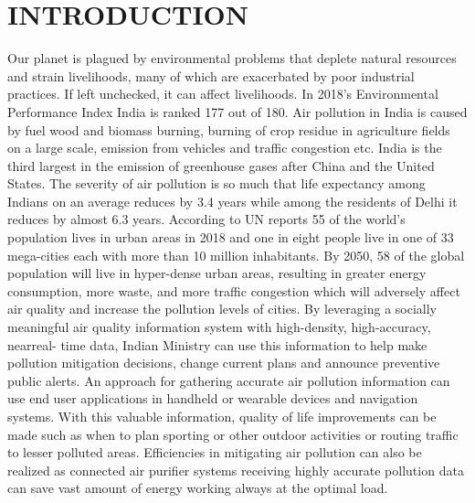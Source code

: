 \documentclass[12pt]{report}	%
\begin{document}

\fancyhf{}
\fancyhead[LE]{\leftmark}
\renewcommand{\footrulewidth}{0.4pt}
\pagestyle{fancy}

\chapter{INTRODUCTION}
Our planet is plagued by environmental problems that
deplete natural resources and strain livelihoods, many
of which are exacerbated by poor industrial practices.
If left unchecked, it can affect livelihoods.
In 2018’s Environmental Performance Index India
is ranked 177 out of 180. Air pollution in India is
caused by fuel wood and biomass burning, burning
of crop residue in agriculture fields on a large scale,
emission from vehicles and traffic congestion etc. India
is the third largest in the emission of greenhouse gases
after China and the United States. The severity of
air pollution is so much that life expectancy among
Indians on an average reduces by 3.4 years while
among the residents of Delhi it reduces by almost 6.3
years.
According to UN reports 55 of the world’s population
lives in urban areas in 2018 and one in eight people
live in one of 33 mega-cities each with more than 10
million inhabitants. By 2050, 58 of the global population
will live in hyper-dense urban areas, resulting
in greater energy consumption, more waste, and more
traffic congestion which will adversely affect air quality
and increase the pollution levels of cities.
By leveraging a socially meaningful air quality information
system with high-density, high-accuracy, nearreal-
time data, Indian Ministry can use this information
to help make pollution mitigation decisions, change
current plans and announce preventive public alerts.
An approach for gathering accurate air pollution information
can use end user applications in handheld
or wearable devices and navigation systems. With this
valuable information, quality of life improvements can
be made such as when to plan sporting or other outdoor
activities or routing traffic to lesser polluted areas.
Efficiencies in mitigating air pollution can also be realized
as connected air purifier systems receiving highly
accurate pollution data can save vast amount of energy
working always at the optimal load.
\end{document}

